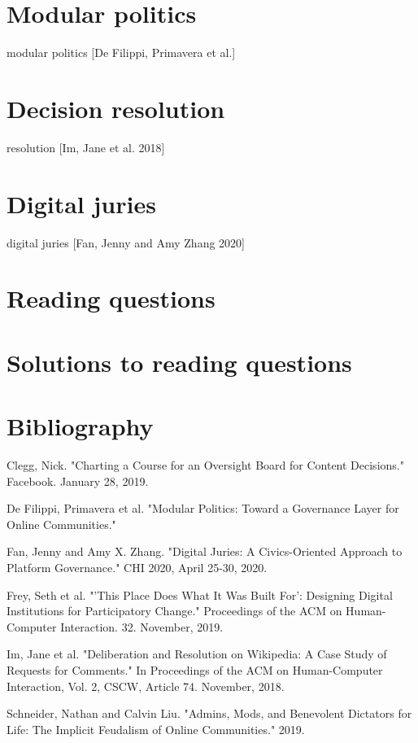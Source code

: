 \documentclass[class=book, crop=false]{standalone}
\begin{document}
\section{Modular politics}

modular politics [De Filippi, Primavera et al.]

\section{Decision resolution}

resolution [Im, Jane et al. 2018]

\section{Digital juries}

digital juries [Fan, Jenny and Amy Zhang 2020]

\section{Reading questions}

\section{Solutions to reading questions}

\section{Bibliography}

Clegg, Nick. "Charting a Course for an Oversight Board for Content Decisions." Facebook. January 28, 2019.

De Filippi, Primavera et al. "Modular Politics: Toward a Governance Layer for Online Communities."

Fan, Jenny and Amy X. Zhang. "Digital Juries: A Civics-Oriented Approach to Platform Governance." CHI 2020, April 25-30, 2020.

Frey, Seth et al. "'This Place Does What It Was Built For': Designing Digital Institutions for Participatory Change." Proceedings of the ACM on Human-Computer Interaction. 32. November, 2019.

Im, Jane et al. "Deliberation and Resolution on Wikipedia: A Case Study of Requests for Comments." In Proceedings of the ACM on Human-Computer Interaction, Vol. 2, CSCW, Article 74. November, 2018.

Schneider, Nathan and Calvin Liu. "Admins, Mods, and Benevolent Dictators for Life: The Implicit Feudalism of Online Communities." 2019.
\end{document}
